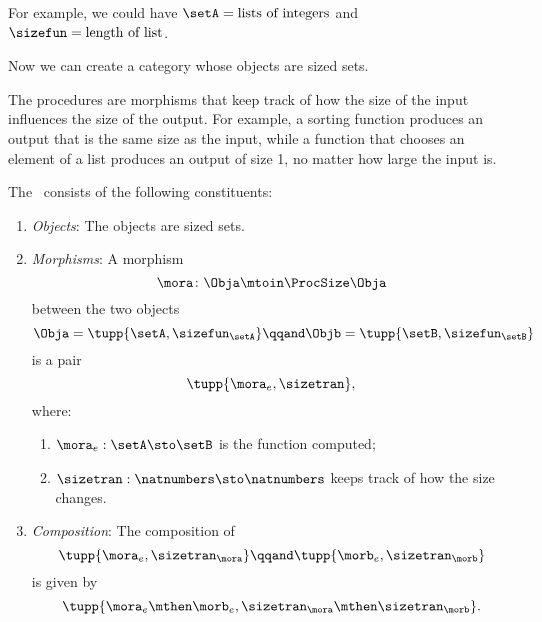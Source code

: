 For example, we could have $\setA = \text{lists of integers}$ and  $\sizefun = \text{length of list}$.

Now we can create a category whose objects are sized sets.

The procedures are morphisms that keep track of how the size of the input influences the size of the output.
For example, a sorting function produces an output that is the same size as the input, while a function that chooses an element of a list produces an output of size 1, no matter how large the input is.

\begin{definition}
    \label{def:ProcSize}
    The ~\ProcSize consists of the following constituents:
    \begin{enumerate}
        \item \emph{Objects}: The objects are sized sets.
        \item \emph{Morphisms}: A morphism
              \begin{equation}
                  \mora \colon \Obja \mtoin\ProcSize \Obja
              \end{equation}
              between the two objects
              \begin{equation}
                  \Obja = \tupp{\setA, \sizefun_{\setA}}
                  \qqand
                  \Objb = \tupp{\setB, \sizefun_{\setB}}
              \end{equation}
              is a pair
              \begin{equation}
                  \tupp{\mora_e, \sizetran },
              \end{equation}
              where:
              \begin{enumerate}
                  \item $\mora_e : \setA \sto \setB$ is the function computed;
                  \item $\sizetran: \natnumbers \sto \natnumbers$ keeps track of how the size changes.
              \end{enumerate}

        \item \emph{Composition}: The composition of
              \begin{equation}
                  \tupp{\mora_e, \sizetran_{\mora} } \qqand
                  \tupp{\morb_e, \sizetran_{\morb} }
              \end{equation}
              is given by
              \begin{equation}
                  \tupp{\mora_e \mthen \morb_e,   \sizetran_{\mora} \mthen \sizetran_{\morb} }.
              \end{equation}
    \end{enumerate}
\end{definition}

